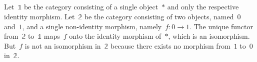 \subsection{}

Let~$𝟙$ be the category consisting of a single object~$\ast$ and only the respective identity morphism.
Let~$𝟚$ be the category consisting of two objects, named~$0$ and~$1$, and a single non-identity morphism, namely~$f \colon 0 \to 1$.
The unique functor from~$𝟚$ to~$𝟙$ maps~$f$ onto the identity morphism of~$\ast$, which is an isomorphism.
But~$f$ is not an isomorphism in~$𝟚$ because there exists no morphism from~$1$ to~$0$ in~$𝟚$.
